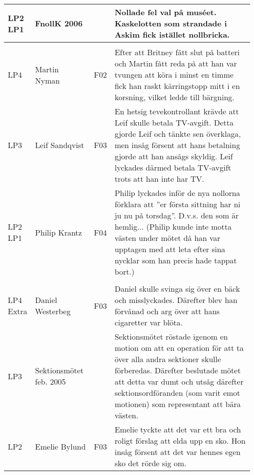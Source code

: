 \documentclass[a4paper]{article}
\begin{document}
\begin{longtable}{p{5mm}>{\raggedright\arraybackslash}p{30mm}p{10mm}p{108mm}}
\makecell{LP2 \\ LP1} & FnollK 2006 &  & Nollade fel val på muséet. Kaskelotten som strandade i Askim fick istället nollbricka.\\ \hline

\rowcolor{veryLightGray} \multicolumn{4}{l}{\textbf{2005/2006}} \\ \hline

LP4 & Martin Nyman & F02 & Efter att Britney fått slut på batteri och Martin fått reda på att han var tvungen att köra i minst en timme fick han raskt kärringstopp mitt i en korsning, vilket ledde till bärgning.\\ \hline

LP3 & Leif Sandqvist & F03 & En hetsig tevekontrollant krävde att Leif skulle betala TV-avgift. Detta gjorde Leif och tänkte sen överklaga, men insåg försent att hans betalning gjorde att han ansågs skyldig. Leif lyckades därmed betala TV-avgift trots att han inte har TV.\\ \hline

\makecell{LP2 \\ LP1} & Philip Krantz & F04 & Philip lyckades inför de nya nollorna förklara att ''er första sittning har ni ju nu på torsdag''. D.v.s. den som är hemlig... (Philip kunde inte motta västen under mötet då han var upptagen med att leta efter sina nycklar som han precis hade tappat bort.)\\ \hline

\rowcolor{veryLightGray} \multicolumn{4}{l}{\textbf{2004/2005}} \\ \hline

\makecell{LP4 \\ Extra} & Daniel Westerbeg & F03 & Daniel skulle svinga sig över en bäck och misslyckades. Därefter blev han förvånad och arg över att hans cigaretter var blöta.\\ \hline

LP3 & Sektionsmötet feb. 2005 & & Sektionsmötet röstade igenom en motion om att en operation för att ta över alla andra sektioner skulle förberedas. Därefter beslutade mötet att detta var dumt och utsåg därefter sektionsordföranden (som varit emot motionen) som  representant att bära västen.\\ \hline

LP2 & Emelie Bylund & F03 & Emelie tyckte att det var ett bra och roligt förslag att elda upp en sko. Hon insåg försent att det var hennes egen sko det rörde sig om.\\ \hline


\end{longtable}
\end{document}
